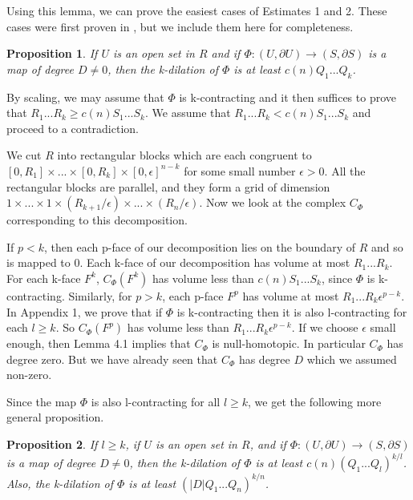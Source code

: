 \documentclass{amsart}
\newtheorem*{Theorem 1}{Theorem 1}
\newtheorem*{Theorem 2}{Theorem 2}
\newtheorem*{Estimate 1}{Estimate 1}
\newtheorem*{Estimate 2}{Estimate 2}
\newtheorem*{key lemma}{Key Lemma}
\newtheorem{prop}{Proposition}[section]
\numberwithin{equation}{section}
\begin{document}
Using this lemma, we can prove the easiest cases of Estimates 1
and 2.  These cases were first proven in \cite{G1}, but we
include them here for completeness.

\begin{prop} If $U$ is an open set in $R$ and if $\Phi: (U,
\partial U) \rightarrow (S, \partial S)$ is a map of degree $D
\not= 0$, then the k-dilation of $\Phi$ is at least $c(n) Q_1 ...
Q_k$.
\end{prop}

\proof By scaling, we may assume that $\Phi$ is k-contracting and
it then suffices to prove that $R_1 ... R_k \ge c(n) S_1 ...
S_k$.  We assume that $R_1 ... R_k < c(n) S_1 ... S_k$ and
proceed to a contradiction.

We cut $R$ into rectangular blocks which are each congruent to
$[0, R_1] \times ... \times [0, R_k] \times [0, \epsilon]^{n-k}$
for some small number $\epsilon > 0$.  All the rectangular blocks
are parallel, and they form a grid of dimension $1 \times ...
\times 1 \times (R_{k+1}/\epsilon) \times ... \times (R_n /
\epsilon)$. Now we look at the complex $C_{\Phi}$ corresponding
to this decomposition.

If $p < k$, then each p-face of our decomposition lies on the
boundary of $R$ and so is mapped to $0$.  Each k-face of our
decomposition has volume at most $R_1 ... R_k$.  For each k-face
$F^k$, $C_{\Phi}(F^k)$ has volume less than $c(n) S_1 ... S_k$,
since $\Phi$ is k-contracting.  Similarly, for $p > k$, each
p-face $F^p$ has volume at most $R_1 ... R_k
\epsilon^{p-k}$.  In Appendix 1, we prove that if $\Phi$ is
k-contracting then it is also l-contracting for each $l \ge k$.
So $C_{\Phi}(F^p)$ has volume less than $R_1 ... R_k
\epsilon^{p-k}$. If we choose $\epsilon$ small enough, then Lemma
4.1 implies that $C_{\Phi}$ is null-homotopic. In particular
$C_{\Phi}$ has degree zero.  But we have already seen that
$C_{\Phi}$ has degree $D$ which we assumed non-zero. 
\endproof

Since the map $\Phi$ is also l-contracting for all $l \ge k$, we
get the following more general proposition.

\begin{prop} If $l \ge k$, if $U$ is an open set in $R$, and if
$\Phi: (U, \partial U) \rightarrow (S, \partial S)$ is a map of
degree $D \not= 0$, then the k-dilation of $\Phi$ is at least
$c(n) (Q_1 ... Q_l)^{k/l}$.  Also, the k-dilation of $\Phi$ is at
least $(|D| Q_1 ... Q_n)^{k/n}$.
\end{prop}
\end{document}
